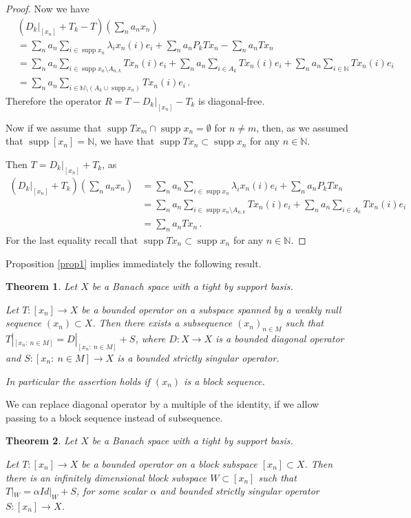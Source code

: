 \documentclass{amsart}
\newtheorem{theorem}{Theorem}[section]
\numberwithin{subsection}{section}
\numberwithin{equation}{section}
\begin{document}
\begin{proof}
Now we have 
\begin{align*}
&(D_k|_{[x_n]}+ T_k-T)(\sum_na_nx_n)\\
&=\sum_na_n\sum_{i\in\operatorname{supp} x_n}\lambda_ix_n(i)e_i+\sum_na_nP_kTx_n-\sum_na_nTx_n\\
&=\sum_na_n\sum_{i\in\operatorname{supp} x_n\setminus A_{n,k}}Tx_n(i)e_i+\sum_na_n\sum_{i\in A_k}Tx_n(i)e_i+\sum_na_n\sum_{i\in{{\mathbb{N}}}}Tx_n(i)e_i\\
&=\sum_na_n\sum_{i\in{{\mathbb{N}}}\setminus (A_k\cup\operatorname{supp} x_n)}Tx_n(i)e_{i}\,.
\end{align*}
Therefore the operator $R=T-D_k|_{[x_n]}-T_k$ is diagonal-free.

Now if we assume that $\operatorname{supp} Tx_m\cap \operatorname{supp} x_n=\emptyset$ for $n\neq m$, then, as we assumed that $\operatorname{supp}[x_n]={{\mathbb{N}}}$, we have that $\operatorname{supp} Tx_n\subset \operatorname{supp} x_n$ for any $n\in{{\mathbb{N}}}$.

Then $T=D_k|_{[x_n]}+T_k$, as
\begin{align*}
\left(D_k|_{[x_n]}+T_k\right)(\sum_na_nx_n)&=\sum_na_n\sum_{i\in\operatorname{supp} x_n}\lambda_ix_n(i)e_i+\sum_na_nP_kTx_n\\
&=\sum_na_n\sum_{i\in\operatorname{supp} x_n\setminus A_{n,k}}Tx_n(i)e_i+\sum_na_n\sum_{i\in A_k}Tx_n(i)e_i\\
&=\sum_na_nTx_n\,.
\end{align*}
For the last equality recall that $\operatorname{supp} Tx_n\subset \operatorname{supp} x_n$ for any $n\in{{\mathbb{N}}}$.
\end{proof}
Proposition \ref{prop1} implies immediately the following result.
\begin{theorem}\label{th1} 
Let $X$ be a Banach space with a tight by support basis.

Let $T:[x_n]\to X$ be a bounded operator on a subspace spanned by a weakly null sequence $(x_n)\subset X$. Then there exists a subsequence $(x_{n})_{n\in M}$ such that $T|_{[x_{n}:\ n\in M]}=D|_{[x_{n}:\ n\in M]}+S$, where $ D:X\to X$  is a bounded diagonal operator  and   $S: [x_n: \ n \in M]\to X$  is a bounded strictly singular operator.

In particular the assertion holds if $(x_n)$ is a block sequence.
\end{theorem}
We can replace diagonal operator by a multiple of the identity, if we allow passing to a block sequence instead of subsequence.
\begin{theorem}\label{id}
Let $X$ be a Banach space with a  tight by support basis. 

Let $T:[x_n]\to X$ be a bounded operator on a block subspace $[x_n]\subset X$. Then there is an infinitely dimensional block subspace $W\subset [x_n]$ such that $T|_W=\alpha Id|_W+S$, for some scalar $\alpha$ and bounded strictly singular operator $S:[x_n]\to X$.
\end{theorem}
\end{document}
